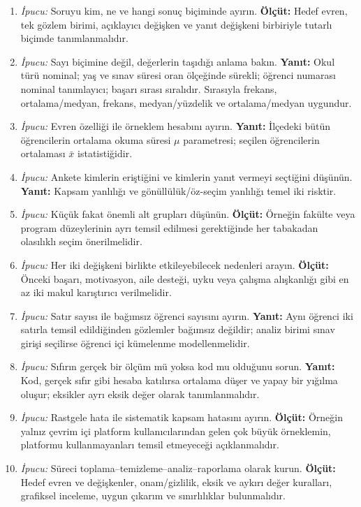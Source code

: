\begin{enumerate}[leftmargin=*,itemsep=5pt]
\item \emph{İpucu:} Soruyu kim, ne ve hangi sonuç biçiminde ayırın.
\textbf{Ölçüt:} Hedef evren, tek gözlem birimi, açıklayıcı değişken ve yanıt
değişkeni birbiriyle tutarlı biçimde tanımlanmalıdır.
\item \emph{İpucu:} Sayı biçimine değil, değerlerin taşıdığı anlama bakın.
\textbf{Yanıt:} Okul türü nominal; yaş ve sınav süresi oran ölçeğinde sürekli;
öğrenci numarası nominal tanımlayıcı; başarı sırası sıralıdır. Sırasıyla
frekans, ortalama/medyan, frekans, medyan/yüzdelik ve ortalama/medyan uygundur.
\item \emph{İpucu:} Evren özelliği ile örneklem hesabını ayırın.
\textbf{Yanıt:} İlçedeki bütün öğrencilerin ortalama okuma süresi $\mu$
parametresi; seçilen öğrencilerin ortalaması $\bar x$ istatistiğidir.
\item \emph{İpucu:} Ankete kimlerin eriştiğini ve kimlerin yanıt vermeyi
seçtiğini düşünün. \textbf{Yanıt:} Kapsam yanlılığı ve gönüllülük/öz-seçim
yanlılığı temel iki risktir.
\item \emph{İpucu:} Küçük fakat önemli alt grupları düşünün.
\textbf{Ölçüt:} Örneğin fakülte veya program düzeylerinin ayrı temsil edilmesi
gerektiğinde her tabakadan olasılıklı seçim önerilmelidir.
\item \emph{İpucu:} Her iki değişkeni birlikte etkileyebilecek nedenleri arayın.
\textbf{Ölçüt:} Önceki başarı, motivasyon, aile desteği, uyku veya çalışma
alışkanlığı gibi en az iki makul karıştırıcı verilmelidir.
\item \emph{İpucu:} Satır sayısı ile bağımsız öğrenci sayısını ayırın.
\textbf{Yanıt:} Aynı öğrenci iki satırla temsil edildiğinden gözlemler bağımsız
değildir; analiz birimi sınav girişi seçilirse öğrenci içi kümelenme modellenmelidir.
\item \emph{İpucu:} Sıfırın gerçek bir ölçüm mü yoksa kod mu olduğunu sorun.
\textbf{Yanıt:} Kod, gerçek sıfır gibi hesaba katılırsa ortalama düşer ve yapay
bir yığılma oluşur; eksikler ayrı eksik değer olarak tanımlanmalıdır.
\item \emph{İpucu:} Rastgele hata ile sistematik kapsam hatasını ayırın.
\textbf{Ölçüt:} Örneğin yalnız çevrim içi platform kullanıcılarından gelen çok
büyük örneklemin, platformu kullanmayanları temsil etmeyeceği açıklanmalıdır.
\item \emph{İpucu:} Süreci toplama--temizleme--analiz--raporlama olarak kurun.
\textbf{Ölçüt:} Hedef evren ve değişkenler, onam/gizlilik, eksik ve aykırı
değer kuralları, grafiksel inceleme, uygun çıkarım ve sınırlılıklar bulunmalıdır.
\end{enumerate}

